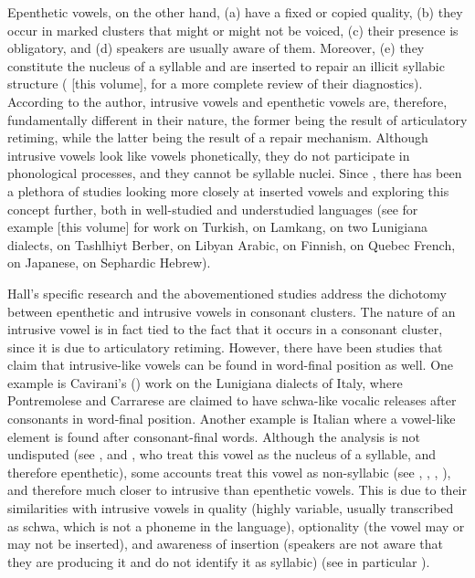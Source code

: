 \documentclass[output=paper,colorlinks,citecolor=brown]{langscibook}
\begin{document}
Epenthetic vowels, on the other hand, (a) have a fixed or copied quality, (b) they occur in marked clusters that might or might not be voiced, (c) their presence is obligatory, and (d) speakers are usually aware of them. Moreover, (e) they constitute the nucleus of a syllable and are inserted to repair an illicit syllabic structure (\citealt{Hall2006, chapters/08.Hall} [this volume], for a more complete review of their diagnostics). According to the author, intrusive vowels and epenthetic vowels are, therefore, fundamentally different in their nature, the former being the result of articulatory retiming, while the latter being the result of a repair mechanism. Although intrusive vowels look like vowels phonetically, they do not participate in phonological processes, and they cannot be syllable nuclei. Since \citet{Hall2006}, there has been a plethora of studies looking more closely at inserted vowels and exploring this concept further, both in well-studied and understudied languages (see for example \citealt{Bellik2019a, chapters/07.Bellik} [this volume] for work on Turkish, \citealt{Burkeetal2019} on Lamkang, \citealt{Cavirani2015} on two Lunigiana dialects, \citealt{Griceetal2015Berber} on Tashlhiyt Berber, \citealt{Heselwoodetal2015} on Libyan Arabic, \citealt{Karlin2021} on Finnish, \citealt{LancienCôté2019} on Quebec French, \citealt{Nogita2011} on Japanese, \citealt{Pariente2010} on Sephardic Hebrew).

Hall’s specific research and the abovementioned studies address the dichotomy between epenthetic and intrusive vowels in consonant clusters. The nature of an intrusive vowel is in fact tied to the fact that it occurs in a consonant cluster, since it is due to articulatory retiming. However, there have been studies that claim that intrusive-like vowels can be found in word-final position as well. One example is Cavirani’s (\citeyear{Cavirani2015}) work on the Lunigiana dialects of Italy, where Pontremolese and Carrarese are claimed to have schwa-like vocalic releases after consonants in word-final position. Another example is Italian where a vowel-like element is found after consonant-final words. Although the analysis is not undisputed (see \citealt{Bafile2002,Bafile2005}, \citealt{Broniś2016} and \citealt{Passino2008}, who treat this vowel as the nucleus of a syllable, and therefore epenthetic), some accounts treat this vowel as non-syllabic (see , \citealt{Miattoetal2019}, \citealt{Miatto2020}, \citealt{Repetti2012}), and therefore much closer to intrusive than epenthetic vowels. This is due to their similarities with intrusive vowels in quality (highly variable, usually transcribed as schwa, which is not a phoneme in the language), optionality (the vowel may or may not be inserted), and awareness of insertion (speakers are not aware that they are producing it and do not identify it as syllabic) (see in particular \citealt{Miatto2020}).
\end{document}
